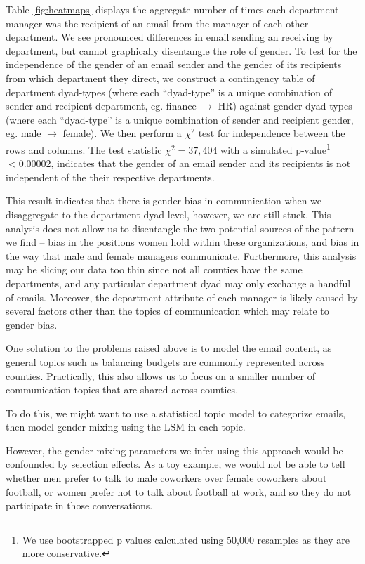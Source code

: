 \documentclass{pnastwo}
\begin{document}
\begin{article}
	
Table \ref{fig:heatmaps} displays the aggregate number of times each department manager was the recipient of an email from the manager of each other department. We see pronounced differences in email sending an receiving by department, but cannot graphically disentangle the role of gender. To test for the independence of the gender of an email sender and the gender of its recipients from which department they direct, we construct a contingency table of department dyad-types (where each ``dyad-type'' is a unique combination of sender and recipient department, eg. finance $\longrightarrow$ HR) against gender dyad-types (where each ``dyad-type'' is a unique combination of sender and recipient gender, eg. male $\longrightarrow$ female).  We then perform a $\chi^2$ test for independence between the rows and columns. The test statistic $\chi^2 = 37,404$ with a simulated p-value\footnote{We use bootstrapped p values calculated using 50,000 resamples as they are more conservative.} $< 0.00002$, indicates that the gender of an email sender and its recipients is not independent of the their respective departments.
	
This result indicates that there is gender bias in communication when we disaggregate to the department-dyad level, however, we are still stuck. This analysis does not allow us to disentangle the two potential sources of the pattern we find -- bias in the positions women hold within these organizations, and bias in the way that male and female managers communicate. Furthermore, this analysis may be slicing our data too thin since not all counties have the same departments, and any particular department dyad may only exchange a handful of emails. Moreover, the department attribute of each manager is likely caused by several factors other than the topics of communication which may relate to gender bias. 
	
One solution to the problems raised above is to model the email content, as general topics such as balancing budgets are commonly represented across counties. Practically, this also allows us to focus on a smaller number of communication topics that are shared across counties.
	
To do this, we might want to use a statistical topic model to categorize emails, then model  gender mixing using the LSM in each topic.
	
However, the gender mixing parameters we infer using this approach would be confounded by selection effects. As a toy example, we would not be able to tell whether men prefer to talk to male coworkers over female coworkers about football, or women prefer not to talk about football at work, and so they do not participate in those conversations. 
	

\end{article}
\end{document}
